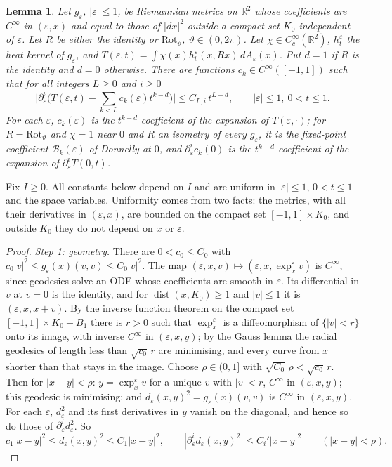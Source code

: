 \documentclass[pdflatex,sn-mathphys-num]{sn-jnl}
\theoremstyle{thmstyleone}%
\newtheorem{lemma}[theorem]{Lemma}%
\theoremstyle{thmstylethree}%
\newcommand{\R}{\mathbb{R}}
\begin{document}
\begin{appendices}
\begin{lemma}\label{lem:param}
Let $g_\varepsilon$, $|\varepsilon|\le1$, be Riemannian metrics on $\R^2$ whose coefficients are $C^\infty$ in $(\varepsilon,x)$ and equal to those of $|dx|^2$ outside a compact set $K_0$ independent of $\varepsilon$. Let $R$ be either the identity or $\mathrm{Rot}_\vartheta$, $\vartheta\in(0,2\pi)$. Let $\chi\in C_c^\infty(\R^2)$, $h^\varepsilon_t$ the heat kernel of $g_\varepsilon$, and $T(\varepsilon,t)=\int\chi(x)h^\varepsilon_t(x,Rx)\,dA_\varepsilon(x)$. Put $d=1$ if $R$ is the identity and $d=0$ otherwise. There are functions $c_k\in C^\infty([-1,1])$ such that for all integers $L\ge0$ and $i\ge0$
\[
\Big|\partial_\varepsilon^i\Big(T(\varepsilon,t)-\sum_{k<L}c_k(\varepsilon)t^{k-d}\Big)\Big|\le C_{L,i}\,t^{L-d},\qquad|\varepsilon|\le1,\ 0<t\le1.
\]
For each $\varepsilon$, $c_k(\varepsilon)$ is the $t^{k-d}$ coefficient of the expansion of $T(\varepsilon,\cdot)$; for $R=\mathrm{Rot}_\vartheta$ and $\chi=1$ near $0$ and $R$ an isometry of every $g_\varepsilon$, it is the fixed-point coefficient $\mathcal B_k(\varepsilon)$ of Donnelly at $0$, and $\partial_\varepsilon^ic_k(0)$ is the $t^{k-d}$ coefficient of the expansion of $\partial_\varepsilon^iT(0,t)$.
\end{lemma}

Fix $I\ge0$. All constants below depend on $I$ and are uniform in $|\varepsilon|\le1$, $0<t\le1$ and the space variables. Uniformity comes from two facts: the metrics, with all their derivatives in $(\varepsilon,x)$, are bounded on the compact set $[-1,1]\times K_0$, and outside $K_0$ they do not depend on $x$ or $\varepsilon$.

\begin{proof}
\emph{Step 1: geometry.} There are $0<c_0\le C_0$ with $c_0|v|^2\le g_\varepsilon(x)(v,v)\le C_0|v|^2$. The map $(\varepsilon,x,v)\mapsto(\varepsilon,x,\exp^\varepsilon_xv)$ is $C^\infty$, since geodesics solve an ODE whose coefficients are smooth in $\varepsilon$. Its differential in $v$ at $v=0$ is the identity, and for $\operatorname{dist}(x,K_0)\ge1$ and $|v|\le1$ it is $(\varepsilon,x,x+v)$. By the inverse function theorem on the compact set $[-1,1]\times\overline{K_0+B_1}$ there is $r>0$ such that $\exp^\varepsilon_x$ is a diffeomorphism of $\{|v|<r\}$ onto its image, with inverse $C^\infty$ in $(\varepsilon,x,y)$; by the Gauss lemma the radial geodesics of length less than $\sqrt{c_0}\,r$ are minimising, and every curve from $x$ shorter than that stays in the image. Choose $\rho\in(0,1]$ with $\sqrt{C_0}\,\rho<\sqrt{c_0}\,r$. Then for $|x-y|<\rho$: $y=\exp^\varepsilon_xv$ for a unique $v$ with $|v|<r$, $C^\infty$ in $(\varepsilon,x,y)$; this geodesic is minimising; and $d_\varepsilon(x,y)^2=g_\varepsilon(x)(v,v)$ is $C^\infty$ in $(\varepsilon,x,y)$. For each $\varepsilon$, $d^2_\varepsilon$ and its first derivatives in $y$ vanish on the diagonal, and hence so do those of $\partial_\varepsilon^id_\varepsilon^2$. So
\begin{equation}\label{eq:dsq}
c_1|x-y|^2\le d_\varepsilon(x,y)^2\le C_1|x-y|^2,\qquad|\partial^i_\varepsilon d_\varepsilon(x,y)^2|\le C_i'|x-y|^2\qquad(|x-y|<\rho).
\end{equation}


\end{proof}
\end{appendices}
\end{document}
